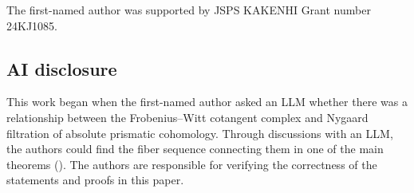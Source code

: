 \documentclass[11pt,a4paper]{amsart}
\begin{document}
The first-named author was supported by JSPS KAKENHI Grant number 24KJ1085.

\subsection*{AI disclosure}
This work began when the first-named author asked an LLM whether there was a relationship between the Frobenius--Witt cotangent complex and Nygaard filtration of absolute prismatic cohomology.
Through discussions with an LLM, the authors could find the fiber sequence connecting them in one of the main theorems ().
The authors are responsible for verifying the correctness of the statements and proofs in this paper.

\end{document}
